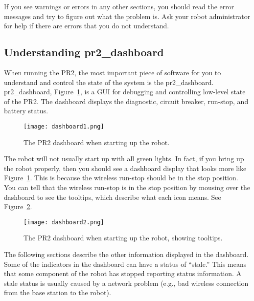 If you see warnings or errors in any other sections, you should read the error messages and try to figure out what the 
problem is.  Ask your robot administrator for help if there are errors that you do not understand.
\subsection{Understanding pr2\_dashboard}
When running the PR2, the most important piece of software for you to understand and control the state of the system is 
the pr2\_dashboard. pr2\_dashboard, Figure~\ref{fig:dashboard1}, is a GUI for debugging and controlling low-level state 
of the PR2. The dashboard displays the diagnostic, circuit breaker, run-stop, and battery status.
\begin{figure}[h]
\centering
\texttt{[image: dashboard1.png]}
\caption{The PR2 dashboard when starting up the robot.}
\label{fig:dashboard1}
\end{figure}
The robot will not usually start up with all green lights. In fact, if you bring up the robot properly, then you should see a dashboard display that looks more like Figure~\ref{fig:dashboard1}.
This is because the wireless run-stop should be in the stop position.
You can tell that the wireless run-stop is in the stop position by mousing over the dashboard to see the tooltips, which describe what each icon means. See Figure~\ref{fig:dashboard2}.

\begin{figure}[h]
\centering
\texttt{[image: dashboard2.png]}
\caption{The PR2 dashboard when starting up the robot, showing tooltips.}
\label{fig:dashboard2}
\end{figure}

The following sections describe the other information displayed in the
dashboard.  Some of the indicators in the dashboard can have a status
of ``stale.''  This means that some component of the robot has stopped
reporting status information.  A stale status is usually caused by a
network problem (e.g., bad wireless connection from the base station to the
robot).


